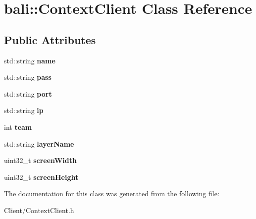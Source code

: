 \hypertarget{classbali_1_1_context_client}{\section{bali\-:\-:Context\-Client Class Reference}
\label{classbali_1_1_context_client}
}
\subsection*{Public Attributes}
\begin{DoxyCompactItemize}
\item 
\hypertarget{classbali_1_1_context_client_af0a9b4b5d5ed01dbdcf4d600616e574d}{std\-::string {\bfseries name}}\label{classbali_1_1_context_client_af0a9b4b5d5ed01dbdcf4d600616e574d}

\item 
\hypertarget{classbali_1_1_context_client_a2f8c58aeeb506315841ddc8941c216fc}{std\-::string {\bfseries pass}}\label{classbali_1_1_context_client_a2f8c58aeeb506315841ddc8941c216fc}

\item 
\hypertarget{classbali_1_1_context_client_a04303217fefbee9179d8b13def423a0f}{std\-::string {\bfseries port}}\label{classbali_1_1_context_client_a04303217fefbee9179d8b13def423a0f}

\item 
\hypertarget{classbali_1_1_context_client_afe175b3cd68c08dee1eeccae180167bd}{std\-::string {\bfseries ip}}\label{classbali_1_1_context_client_afe175b3cd68c08dee1eeccae180167bd}

\item 
\hypertarget{classbali_1_1_context_client_ad4a3a40a91271bb394df01bec6181386}{int {\bfseries team}}\label{classbali_1_1_context_client_ad4a3a40a91271bb394df01bec6181386}

\item 
\hypertarget{classbali_1_1_context_client_a9de1bcc3ccb7b00f85ac7f00db19a7e4}{std\-::string {\bfseries layer\-Name}}\label{classbali_1_1_context_client_a9de1bcc3ccb7b00f85ac7f00db19a7e4}

\item 
\hypertarget{classbali_1_1_context_client_a5e468bfeed2c728a50ce26e6495672ca}{uint32\-\_\-t {\bfseries screen\-Width}}\label{classbali_1_1_context_client_a5e468bfeed2c728a50ce26e6495672ca}

\item 
\hypertarget{classbali_1_1_context_client_a502a1bbc96aba36d79d74ad1b224492f}{uint32\-\_\-t {\bfseries screen\-Height}}\label{classbali_1_1_context_client_a502a1bbc96aba36d79d74ad1b224492f}

\end{DoxyCompactItemize}


The documentation for this class was generated from the following file\-:\begin{DoxyCompactItemize}
\item 
Client/Context\-Client.\-h\end{DoxyCompactItemize}
